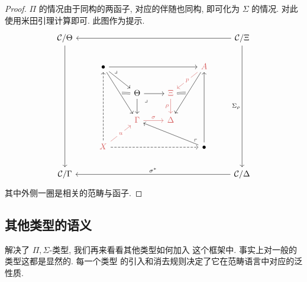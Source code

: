 \begin{proof}
\(\Pi\) 的情况由于同构的两函子, 对应的伴随也同构, 即可化为 \(\Sigma\) 的情况.
对此使用米田引理计算即可. 此图作为提示.
  \[\begin{tikzcd}
    {\mathcal C/\Theta} &&&&& {\mathcal C/\Xi} \\
    & \bullet &&& \textcolor{rgb,255:red,214;green,92;blue,92}{A} \\
    && \Theta & \textcolor{rgb,255:red,214;green,92;blue,92}{\Xi} \\
    && \textcolor{rgb,255:red,214;green,92;blue,92}{\Gamma} & \textcolor{rgb,255:red,214;green,92;blue,92}{\Delta} \\
    & \textcolor{rgb,255:red,214;green,92;blue,92}{X} &&& \bullet \\
    {\mathcal C/\Gamma} &&&&& {\mathcal C/\Delta}
    \arrow["\sigma", color={rgb,255:red,214;green,92;blue,92}, from=4-3, to=4-4]
    \arrow[from=3-3, to=4-3]
    \arrow["\rho"', color={rgb,255:red,214;green,92;blue,92}, from=3-4, to=4-4]
    \arrow[from=3-3, to=3-4]
    \arrow["\lrcorner"{anchor=center, pos=0.125}, draw=none, from=3-3, to=4-4]
    \arrow["{\Sigma_\rho}"', from=1-6, to=6-6]
    \arrow["{\sigma^*}"', from=6-6, to=6-1]
    \arrow[from=1-6, to=1-1]
    \arrow[from=1-1, to=6-1]
    \arrow["p"{description}, color={rgb,255:red,214;green,92;blue,92}, from=2-5, to=3-4]
    \arrow[from=5-5, to=2-5]
    \arrow[from=5-5, to=4-3]
    \arrow["\lrcorner"{anchor=center, pos=0.125, rotate=180}, draw=none, from=5-5, to=4-4]
    \arrow[from=2-2, to=2-5]
    \arrow[from=2-2, to=3-3]
    \arrow["\lrcorner"{anchor=center, pos=0.125}, draw=none, from=2-2, to=3-4]
    \arrow[dashed, from=5-2, to=2-2]
    \arrow[dashed, from=5-2, to=5-5]
    \arrow["u"{description}, color={rgb,255:red,214;green,92;blue,92}, from=5-2, to=4-3]
    \arrow[""{name=0, anchor=center, inner sep=0}, from=2-5, to=4-4]
    \arrow[""{name=1, anchor=center, inner sep=0}, from=2-2, to=4-3]
    \arrow[shorten >=2pt, Rightarrow, no head, from=3-4, to=0]
    \arrow[shorten <=2pt, Rightarrow, no head, from=1, to=3-3]
  \end{tikzcd}\]
  其中外侧一圈是相关的范畴与函子.
\end{proof}

\subsection{其他类型的语义}

解决了 \(\Pi,\Sigma\)-类型, 我们再来看看其他类型如何加入
这个框架中. 事实上对一般的类型这都是显然的. 每一个类型
的引入和消去规则决定了它在范畴语言中对应的泛性质.

